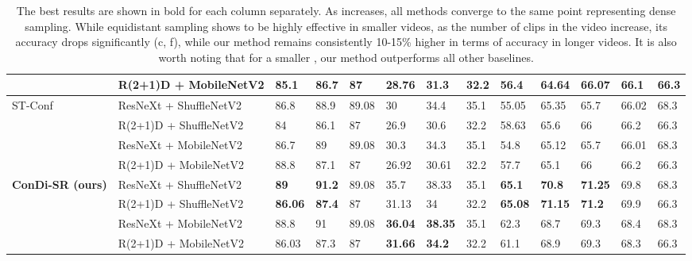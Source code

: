 \documentclass[a4paper,conference]{IEEEtran}
\begin{document}
\begin{table*}[h]
\begin{center}
{\begin{tabular}{lllllllllllll}
 & \cellcolor[HTML]{EFEFEF}R(2+1)D + MobileNetV2 & 85.1 & 86.7 & 87 & \cellcolor[HTML]{EFEFEF}28.76 & \cellcolor[HTML]{EFEFEF}31.3 & \cellcolor[HTML]{EFEFEF}32.2 & 56.4 & 64.64 & 66.07 & 66.1 & 66.3 \\ \hline
ST-Conf & \cellcolor[HTML]{EFEFEF}ResNeXt + ShuffleNetV2 & 86.8 & 88.9 & 89.08 & \cellcolor[HTML]{EFEFEF}30 & \cellcolor[HTML]{EFEFEF}34.4 & \cellcolor[HTML]{EFEFEF}35.1 & 55.05 & 65.35 & 65.7 & 66.02 & 68.3 \\
 & \cellcolor[HTML]{EFEFEF}R(2+1)D + ShuffleNetV2 & 84 & 86.1 & 87 & \cellcolor[HTML]{EFEFEF}26.9 & \cellcolor[HTML]{EFEFEF}30.6 & \cellcolor[HTML]{EFEFEF}32.2 & 58.63 & 65.6 & 66 & 66.2 & 66.3 \\
 & \cellcolor[HTML]{EFEFEF}ResNeXt + MobileNetV2 & 86.7 & 89 & 89.08 & \cellcolor[HTML]{EFEFEF}30.3 & \cellcolor[HTML]{EFEFEF}34.3 & \cellcolor[HTML]{EFEFEF}35.1 & 54.8 & 65.12 & 65.7 & 66.01 & 68.3 \\
 & \cellcolor[HTML]{EFEFEF}R(2+1)D + MobileNetV2 & 88.8 & 87.1 & 87 & \cellcolor[HTML]{EFEFEF}26.92 & \cellcolor[HTML]{EFEFEF}30.61 & \cellcolor[HTML]{EFEFEF}32.2 & 57.7 & 65.1 & 66 & 66.2 & 66.3 \\ \hline
\textbf{ConDi-SR (ours)} & \cellcolor[HTML]{EFEFEF}ResNeXt + ShuffleNetV2 & \textbf{89} & \textbf{91.2} & 89.08 & \cellcolor[HTML]{EFEFEF}35.7 & \cellcolor[HTML]{EFEFEF}38.33 & \cellcolor[HTML]{EFEFEF}35.1 & \textbf{65.1} & \textbf{70.8} & \textbf{71.25} & 69.8 & 68.3 \\
 & \cellcolor[HTML]{EFEFEF}R(2+1)D + ShuffleNetV2 & \textbf{86.06} & \textbf{87.4} & 87 & \cellcolor[HTML]{EFEFEF}31.13 & \cellcolor[HTML]{EFEFEF}34 & \cellcolor[HTML]{EFEFEF}32.2 & \textbf{65.08} & \textbf{71.15} & \textbf{71.2} & 69.9 & 66.3 \\
 & \cellcolor[HTML]{EFEFEF}ResNeXt + MobileNetV2 & 88.8 & 91 & 89.08 & \cellcolor[HTML]{EFEFEF}\textbf{36.04} & \cellcolor[HTML]{EFEFEF}\textbf{38.35} & \cellcolor[HTML]{EFEFEF}35.1 & 62.3 & 68.7 & 69.3 & 68.4 & 68.3 \\
 & \cellcolor[HTML]{EFEFEF}R(2+1)D + MobileNetV2 & 86.03 & 87.3 & 87 & \cellcolor[HTML]{EFEFEF}\textbf{31.66} & \cellcolor[HTML]{EFEFEF}\textbf{34.2} & \cellcolor[HTML]{EFEFEF}32.2 & 61.1 & 68.9 & 69.3 & 68.3 & 66.3 \\
\bottomrule
\end{tabular}}
\caption{The best results are shown in bold for each column separately. As  increases, all methods converge to the same point representing dense sampling. While equidistant sampling shows to be highly effective in smaller videos, as the number of clips in the video increase, its accuracy drops significantly (c, f), while our method remains consistently 10-15\% higher in terms of accuracy in longer videos. It is also worth noting that for a smaller , our method outperforms all other baselines.}
\label{tab:classification_accuracy}
\end{center}
\vspace{-15pt}
\end{table*}
\end{document}

